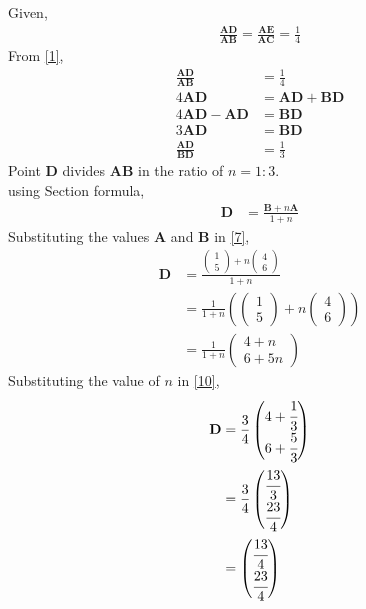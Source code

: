 \documentclass[12pt]{article}
\providecommand{\brak}[1]{\ensuremath{\left(#1\right)}}
\newcommand{\myvec}[1]{\ensuremath{\begin{pmatrix}#1\end{pmatrix}}}
\let\vec\mathbf
\begin{document}
\begin{enumerate}
Given,
\begin{align}
\frac{\vec{A}\vec{D}}{\vec{A}\vec{B}}=\frac{\vec{A}\vec{E}}{\vec{A}\vec{C}}=\frac{1}{4}\label{1}
\end{align}
From \eqref{1},
\begin{align}
\frac{\vec{A}\vec{D}}{\vec{A}\vec{B}} &=\frac{1}{4}\\
4 \vec{A}\vec{D} &=\vec{A}\vec{D} + \vec{B}\vec{D}\\
4 \vec{A}\vec{D}-\vec{A}\vec{D} &=\vec{B}\vec{D}\\
3 \vec{A}\vec{D} &=\vec{B}\vec{D}\\
\frac{\vec{A}\vec{D}}{\vec{B}\vec{D}} &=\frac{1}{3}
\end{align}
Point $\vec{D}$ divides $\vec{A}\vec{B}$ in the ratio of $n = 1:3$.\\
using Section formula,
\begin{align}
\vec{D} &=\frac{\vec{B}+n\vec{A}}{1+n}\label{7}
\end{align}
Substituting the values $\vec{A}$ and $\vec{B}$ in \eqref{7},
\begin{align}
\vec{D} &=\frac{{\myvec{1\\5}+n\myvec{4\\6}}}{1+n}\\
          &=\frac{1}{1+n}\brak{{\myvec{1\\5}+n\myvec{4\\6}}} \\
         &=\frac{1}{1+n}\myvec{4+n\\6+5n} \label{10}
\end{align}
Substituting the value of $n$ in \eqref{10},
\begin{align}
\vec{D} &=\frac{3}{4}\myvec{4+\cfrac{1}{3}\\6+\cfrac{5}{3}}\\
		&=\frac{3}{4}\myvec{\cfrac{13}{3}\\ \cfrac{23}{4}}\\
		&=\myvec{\cfrac{13}{4}\\ \cfrac{23}{4}}
\end{align}


\end{enumerate}
\end{document}
